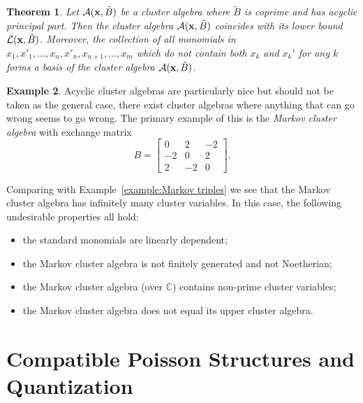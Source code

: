 \documentclass{amsart}
\newtheorem{theorem}{Theorem}[section]
\theoremstyle{definition}
\newtheorem{example}[theorem]{Example}
\theoremstyle{remark}
\numberwithin{equation}{section}
\newcommand{\cA}{{\mathcal{A}}}
\newcommand{\cL}{{\mathcal{L}}}
\newcommand{\x}{{\bf x}}
\newcommand{\bx}{{\bf x}}
\newcommand{\CC}{{\mathbb{C}}}
\begin{document}
  \begin{theorem}\cite{BFZ05}\label{th:lower bounds}
    Let $\cA(\x,\tilde B)$ be a cluster algebra where $\tilde B$ is coprime and has acyclic principal part.  Then the cluster algebra $\cA(\x,\tilde B)$ coincides with its lower bound $\cL(\x,\tilde B)$.  Moreover, the collection of all monomials in $x_1,x'_1,\ldots,x_n,x'_n,x_{n+1},\ldots,x_m$ which do not contain both $x_k$ and $x_k'$ for any $k$ forms a basis of the cluster algebra $\cA(\bx,\tilde B)$.
  \end{theorem}

  \begin{example}
    Acyclic cluster algebras are particularly nice but should not be taken as the general case, there exist cluster algebras where anything that can go wrong seems to go wrong.  The primary example of this is the \emph{Markov cluster algebra} with exchange matrix 
    \[B=\left[\begin{array}{ccc} 0 & 2 & -2\\ -2 & 0 & 2\\ 2 & -2 & 0\end{array}\right].\]
    
    Comparing with Example~\ref{example:Markov triples} we see that the Markov cluster algebra has infinitely many cluster variables.  In this case, the following undesirable properties all hold:
    \begin{itemize}
      \item the standard monomials are linearly dependent;
      \item the Markov cluster algebra is not finitely generated and not Noetherian;
      \item the Markov cluster algebra (over $\CC$) contains non-prime cluster variables;
      \item the Markov cluster algebra does not equal its upper cluster algebra.
    \end{itemize}
  \end{example}

\section{Compatible Poisson Structures and Quantization}\label{sec:poisson_and_quantum}
\end{document}
